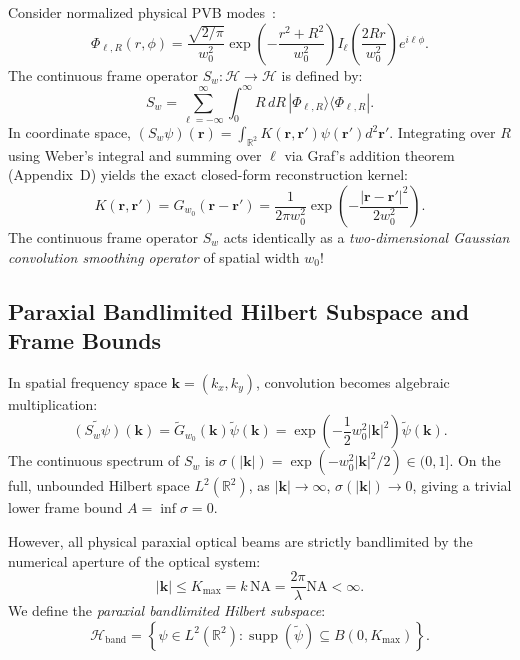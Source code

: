 \documentclass[11pt,a4paper]{article}
\begin{document}
Consider normalized physical PVB modes~\cite{Ferreira2026}:
\begin{equation}
\Phi_{\ell, R}(r, \phi) = \frac{\sqrt{2/\pi}}{w_0^2} \exp\left(-\frac{r^2 + R^2}{w_0^2}\right) I_\ell\left(\frac{2 R r}{w_0^2}\right) e^{i \ell \phi}.
\end{equation}
The continuous frame operator $S_w: \mathcal{H} \to \mathcal{H}$ is defined by:
\begin{equation}
S_w = \sum_{\ell=-\infty}^\infty \int_0^\infty R \, dR \, |\Phi_{\ell, R}\rangle \langle \Phi_{\ell, R}|.
\end{equation}
In coordinate space, $(S_w \psi)(\mathbf{r}) = \int_{\mathbb{R}^2} K(\mathbf{r}, \mathbf{r}') \psi(\mathbf{r}') d^2\mathbf{r}'$. Integrating over $R$ using Weber's integral and summing over $\ell$ via Graf's addition theorem (Appendix~D) yields the exact closed-form reconstruction kernel:
\begin{equation}
\boxed{K(\mathbf{r}, \mathbf{r}') = G_{w_0}(\mathbf{r} - \mathbf{r}') = \frac{1}{2\pi w_0^2} \exp\left(-\frac{|\mathbf{r} - \mathbf{r}'|^2}{2 w_0^2}\right).}
\label{eq:gaussian_kernel}
\end{equation}
The continuous frame operator $S_w$ acts identically as a \emph{two-dimensional Gaussian convolution smoothing operator} of spatial width $w_0$!

\subsection{Paraxial Bandlimited Hilbert Subspace and Frame Bounds}

In spatial frequency space $\mathbf{k} = (k_x, k_y)$, convolution becomes algebraic multiplication:
\begin{equation}
\widetilde{(S_w \psi)}(\mathbf{k}) = \widetilde{G}_{w_0}(\mathbf{k}) \widetilde{\psi}(\mathbf{k}) = \exp\left(-\frac{1}{2} w_0^2 |\mathbf{k}|^2\right) \widetilde{\psi}(\mathbf{k}).
\end{equation}
The continuous spectrum of $S_w$ is $\sigma(|\mathbf{k}|) = \exp(-w_0^2 |\mathbf{k}|^2 / 2) \in (0, 1]$. On the full, unbounded Hilbert space $L^2(\mathbb{R}^2)$, as $|\mathbf{k}| \to \infty$, $\sigma(|\mathbf{k}|) \to 0$, giving a trivial lower frame bound $A = \inf \sigma = 0$.

However, all physical paraxial optical beams are strictly bandlimited by the numerical aperture of the optical system:
\begin{equation}
|\mathbf{k}| \le K_{\max} = k \, \text{NA} = \frac{2\pi}{\lambda} \text{NA} < \infty.
\end{equation}
We define the \emph{paraxial bandlimited Hilbert subspace}:
\begin{equation}
\mathcal{H}_{\text{band}} = \left\{ \psi \in L^2(\mathbb{R}^2) : \operatorname{supp}(\widetilde{\psi}) \subseteq B(0, K_{\max}) \right\}.
\end{equation}
\end{document}
